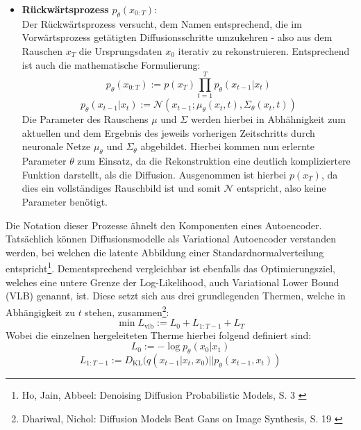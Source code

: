 \begin{itemize}
    \item \textbf{Rückwärtsprozess} $p_\theta(x_{0:T})$: \\
    Der Rückwärtsprozess versucht, dem Namen entsprechend, die im Vorwärtsprozess getätigten Diffusionsschritte umzukehren - also aus dem Rauschen $x_T$ die Ursprungsdaten $x_0$ iterativ zu rekonstruieren. Entsprechend ist auch die mathematische Formulierung:
    \begin{equation}
        p_\theta(x_{0:T}) := p(x_T) \prod_{t=1}^T p_\theta(x_{t-1} | x_{t}) 
    \end{equation}
    \begin{equation}
        p_\theta(x_{t-1} | x_{t})  :=  
        \mathcal N(x_{t-1}; \mu_\theta(x_{t}, t), \Sigma_\theta(x_{t}, t))
    \end{equation}
    Die Parameter des Rauschens $\mu$ und $\Sigma$ werden hierbei in Abhähnigkeit zum aktuellen und dem Ergebnis des jeweils vorherigen Zeitschritts durch neuronale Netze $\mu_\theta$ und $\Sigma_\theta$ abgebildet. Hierbei kommen nun erlernte Parameter $\theta$ zum Einsatz, da die Rekonstruktion eine deutlich kompliziertere Funktion darstellt, als die Diffusion. Ausgenommen ist hierbei $p(x_T)$, da dies ein vollständiges Rauschbild ist und somit $\mathcal N$ entspricht, also keine Parameter benötigt.
\end{itemize}
Die Notation dieser Prozesse ähnelt den Komponenten eines Autoencoder. Tatsächlich können Diffusionsmodelle als Variational Autoencoder verstanden werden, bei welchen die latente Abbildung einer Standardnormalverteilung entspricht\footnote{
    Ho, Jain, Abbeel: Denoising Diffusion Probabilistic Models, S. 3
    \cite{ho2020denoisingdiffusionprobabilisticmodels}
}.
Dementsprechend vergleichbar ist ebenfalls das Optimierungsziel, welches eine untere Grenze der Log-Likelihood, auch Variational Lower Bound (VLB) genannt, ist. Diese setzt sich aus drei grundlegenden Thermen, welche in Abhängigkeit zu $t$ stehen, zusammen\footnote{
    Dhariwal, Nichol: Diffusion Models Beat Gans on Image Synthesis, S. 19
    \cite{dhariwal2021diffusionmodelsbeatgans}
}:
\begin{equation}
    \min L_\text{vlb} := L_0 + L_{1:T-1} + L_T 
\end{equation}
Wobei die einzelnen hergeleiteten Therme hierbei folgend definiert sind:
\begin{equation}
    L_0 := -\log p_\theta(x_0|x_1)
\end{equation}
\begin{equation}
    L_{1:T-1} := D_\text{KL}(q(x_{t-1}|x_t,x_0)||p_\theta(x_{t-1},x_t))
\end{equation}
